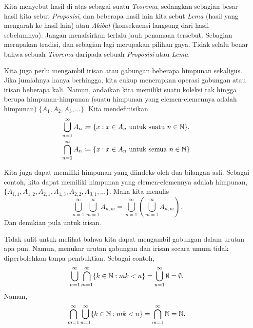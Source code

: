 Kita menyebut hasil di atas sebagai suatu \emph{Teorema}, sedangkan sebagian besar
hasil kita sebut \emph{Proposisi}, dan beberapa hasil lain kita sebut
\emph{Lema} (hasil yang mengarah ke hasil lain) atau
\emph{Akibat} (konsekuensi langsung dari hasil sebelumnya).
Jangan menafsirkan terlalu jauh
penamaan tersebut.  Sebagian merupakan tradisi, dan sebagian lagi merupakan
pilihan gaya.
Tidak selalu benar bahwa sebuah \emph{Teorema}
 daripada sebuah
\emph{Proposisi} atau \emph{Lema}.

\medskip

Kita juga perlu mengambil irisan atau gabungan beberapa himpunan sekaligus.
Jika jumlahnya hanya berhingga, kita cukup menerapkan operasi gabungan atau
irisan beberapa kali.  Namun, andaikan kita memiliki suatu koleksi tak hingga
berupa himpunan-himpunan (suatu himpunan yang elemen-elemennya adalah himpunan)
$\{ A_1, A_2, A_3, \ldots \}$.  Kita mendefinisikan
\begin{align*}
& \bigcup_{n=1}^\infty A_n \coloneqq \{ x : x \in A_n \text{ untuk suatu } n \in {\mathbb{N}}
\} , \\
& \bigcap_{n=1}^\infty A_n \coloneqq \{ x : x \in A_n \text{ untuk semua } n \in {\mathbb{N}}
\} .
\end{align*}

Kita juga dapat memiliki himpunan yang diindeks oleh dua bilangan asli.
Sebagai contoh, kita dapat memiliki himpunan yang elemen-elemennya adalah
himpunan,
$\{ A_{1,1}, A_{1,2}, A_{2,1}, A_{1,3}, A_{2,2}, A_{3,1}, \ldots \}$.  Maka
kita menulis
\begin{equation*}
\bigcup_{n=1}^\infty \bigcup_{m=1}^\infty A_{n,m}
=
\bigcup_{n=1}^\infty \left( \bigcup_{m=1}^\infty A_{n,m} \right) .
\end{equation*}
Dan demikian pula untuk irisan.

Tidak sulit untuk melihat bahwa kita dapat mengambil gabungan dalam urutan apa
pun.  Namun, menukar urutan gabungan dan irisan secara umum tidak diperbolehkan
tanpa pembuktian.  Sebagai contoh,
\begin{equation*}
\bigcup_{n=1}^\infty
\bigcap_{m=1}^\infty
\{ k \in {\mathbb{N}} : mk < n \}
=
\bigcup_{n=1}^\infty \emptyset = \emptyset .
\end{equation*}
Namun,
\begin{equation*}
\bigcap_{m=1}^\infty
\bigcup_{n=1}^\infty
\{ k \in {\mathbb{N}} : mk < n \}
=
\bigcap_{m=1}^\infty
{\mathbb{N}}
=
{\mathbb{N}}.
\end{equation*}

